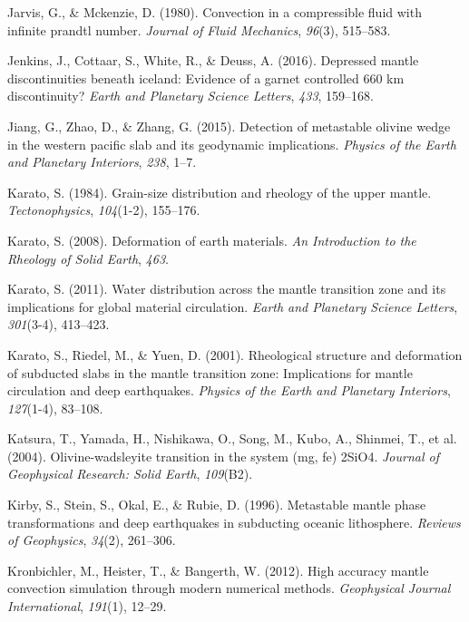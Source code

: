 \documentclass[draft,linenumbers]{agujournal2019}
\newlength{\cslhangindent}
\newenvironment{CSLReferences}[2]
 {\begin{list}{}{
  \setlength{\itemindent}{0pt}
  \setlength{\leftmargin}{0pt}
  \setlength{\parsep}{0pt}
  \ifodd #1
   \setlength{\leftmargin}{\cslhangindent}
   \setlength{\itemindent}{-\cslhangindent}
  \fi
  \setlength{\itemsep}{#2\baselineskip}
  }
  \item\relax}
 {\end{list}}
\begin{document}
\begin{CSLReferences}{1}{0}
Jarvis, G., \& Mckenzie, D. (1980). Convection in a compressible fluid
with infinite prandtl number. \emph{Journal of Fluid Mechanics},
\emph{96}(3), 515--583.

Jenkins, J., Cottaar, S., White, R., \& Deuss, A. (2016). Depressed
mantle discontinuities beneath iceland: Evidence of a garnet controlled
660 km discontinuity? \emph{Earth and Planetary Science Letters},
\emph{433}, 159--168.

Jiang, G., Zhao, D., \& Zhang, G. (2015). Detection of metastable
olivine wedge in the western pacific slab and its geodynamic
implications. \emph{Physics of the Earth and Planetary Interiors},
\emph{238}, 1--7.

Karato, S. (1984). Grain-size distribution and rheology of the upper
mantle. \emph{Tectonophysics}, \emph{104}(1-2), 155--176.

Karato, S. (2008). Deformation of earth materials. \emph{An Introduction
to the Rheology of Solid Earth}, \emph{463}.

Karato, S. (2011). Water distribution across the mantle transition zone
and its implications for global material circulation. \emph{Earth and
Planetary Science Letters}, \emph{301}(3-4), 413--423.

Karato, S., Riedel, M., \& Yuen, D. (2001). Rheological structure and
deformation of subducted slabs in the mantle transition zone:
Implications for mantle circulation and deep earthquakes. \emph{Physics
of the Earth and Planetary Interiors}, \emph{127}(1-4), 83--108.

{Katsura, T., Yamada, H., Nishikawa, O., Song, M., Kubo, A., Shinmei,
T., et al.} (2004). Olivine-wadsleyite transition in the system (mg, fe)
2SiO4. \emph{Journal of Geophysical Research: Solid Earth},
\emph{109}(B2).

Kirby, S., Stein, S., Okal, E., \& Rubie, D. (1996). Metastable mantle
phase transformations and deep earthquakes in subducting oceanic
lithosphere. \emph{Reviews of Geophysics}, \emph{34}(2), 261--306.

Kronbichler, M., Heister, T., \& Bangerth, W. (2012). High accuracy
mantle convection simulation through modern numerical methods.
\emph{Geophysical Journal International}, \emph{191}(1), 12--29.


\end{CSLReferences}
\end{document}
